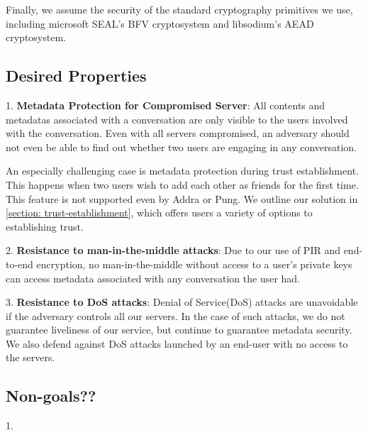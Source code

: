 
Finally, we assume the security of the standard cryptography primitives we use, including microsoft SEAL's BFV cryptosystem and libsodium's AEAD cryptosystem. 

\subsection{Desired Properties}

1. \textbf{Metadata Protection for Compromised Server}: All contents and metadatas associated with a conversation are only visible to the users involved with the conversation. Even with all servers compromised, an adversary should not even be able to find out whether two users are engaging in any conversation.

An especially challenging case is metadata protection during trust establishment. This happens when two users wish to add each other as friends for the first time. This feature is not supported even by Addra or Pung. We outline our solution in \cref{section: trust-establishment}, which offers users a variety of options to establishing trust.

2. \textbf{Resistance to man-in-the-middle attacks}: Due to our use of PIR and end-to-end encryption, no man-in-the-middle without access to a user's private keys can access metadata associated with any conversation the user had.

3. \textbf{Resistance to DoS attacks}: Denial of Service(DoS) attacks are unavoidable if the adversary controls all our servers. In the case of such attacks, we do not guarantee liveliness of our service, but continue to guarantee metadata security. We also defend against DoS attacks launched by an end-user with no access to the servers.

\subsection{Non-goals??}
1. 


